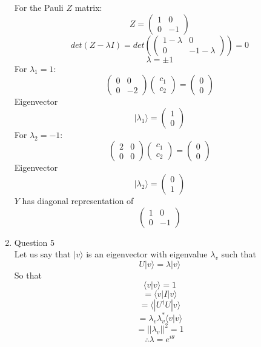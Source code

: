 \documentclass[12pt]{article}
\newcommand{\ket}[1]{\vert{#1}\rangle}
\begin{document}
\begin{enumerate}
For the Pauli $Z$ matrix:
$$ Z = \left(\begin{array}{cc} 1 & 0 \\ 0 & -1  \end{array}\right) $$
$$ det(Z-\lambda I) = det(\left(\begin{array}{cc} 1-\lambda & 0 \\ 0 & -1-\lambda  \end{array}\right) ) = 0 $$
$$ \lambda = \pm 1 $$ 
For $\lambda_1 = 1$:
$$ \left(\begin{array}{cc} 0 & 0 \\ 0 & -2  \end{array}\right) \left(\begin{array}{cc} c_1 \\ c_2 \end{array}\right) = \left(\begin{array}{cc} 0 \\ 0 \end{array}\right) $$
Eigenvector 
$$ \ket{\lambda_1} =  \left(\begin{array}{cc} 1 \\ 0\end{array}\right) $$
For $\lambda_2 =-1$:
$$ \left(\begin{array}{cc} 2 & 0 \\ 0 & 0  \end{array}\right) \left(\begin{array}{cc} c_1 \\ c_2 \end{array}\right) = \left(\begin{array}{cc} 0 \\ 0 \end{array}\right) $$
Eigenvector 
$$ \ket{\lambda_2} =  \left(\begin{array}{cc} 0 \\ 1\end{array}\right) $$
$Y$ has diagonal representation of 
$$ \left(\begin{array}{cc} 1 & 0 \\ 0 & -1\end{array}\right) $$

\item Question 5
\\
Let us say that $\ket{v}$ is an eigenvector with eigenvalue $\lambda_v$ such that
$$ U \ket{v} = \lambda \ket{v} $$
So that
$$ \langle v | v \rangle = 1 $$
$$ = \langle v | I | v \rangle $$ 
$$ =\langle | U^\dagger U | v \rangle $$
$$ = \lambda_v \lambda_v^* \langle v|v\rangle $$
$$= ||\lambda_v || ^2 = 1$$
$$ \therefore \lambda = e^{i\theta} $$



\end{enumerate}
\end{document}
